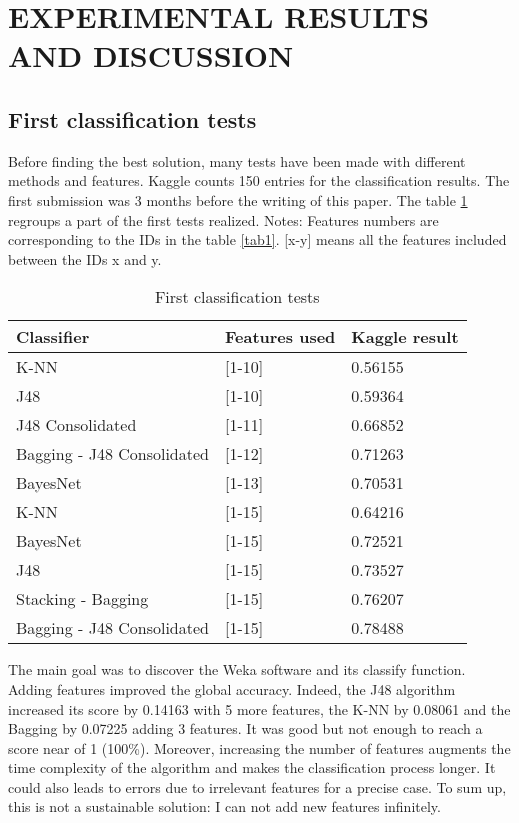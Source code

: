 \documentclass[runningheads]{llncs}
\begin{document}
\section{EXPERIMENTAL RESULTS AND DISCUSSION}
%
\subsection{First classification tests}
%
Before finding the best solution, many tests have been made with different methods and features. Kaggle counts 150 entries for the classification results. The first submission was 3 months before the writing of this paper. The table \ref{tab2} regroups a part of the first tests realized. Notes: Features numbers are corresponding to the IDs in the table \ref{tab1}. [x-y] means all the features included between the IDs x and y. \par
%
\begin{table}
\caption{First classification tests}\label{tab2}
\centering
\begin{tabular}{|l|l|l|}
\hline
Classifier & Features used & Kaggle result \\
\hline \hline
K-NN & [1-10] & 0.56155 \\\hline
J48 & [1-10] & 0.59364 \\\hline
J48 Consolidated & [1-11] & 0.66852 \\\hline
Bagging - J48 Consolidated & [1-12] & 0.71263 \\\hline
BayesNet & [1-13] & 0.70531 \\\hline
K-NN & [1-15] & 0.64216 \\\hline
BayesNet & [1-15] & 0.72521 \\\hline
J48 & [1-15] & 0.73527 \\\hline
Stacking - Bagging & [1-15] & 0.76207 \\\hline
Bagging - J48 Consolidated & [1-15] & 0.78488 \\
\hline
\end{tabular}
\end{table}
%
The main goal was to discover the Weka software and its classify function. Adding features improved the global accuracy. Indeed, the J48 algorithm increased its score by 0.14163 with 5 more features, the K-NN by 0.08061 and the Bagging by 0.07225 adding 3 features. It was good but not enough to reach a score near of 1 (100\%). Moreover, increasing the number of features augments the time complexity of the algorithm and makes the classification process longer. It could also leads to errors due to irrelevant features for a precise case. To sum up, this is not a sustainable solution: I can not add new features infinitely.
%
\end{document}
